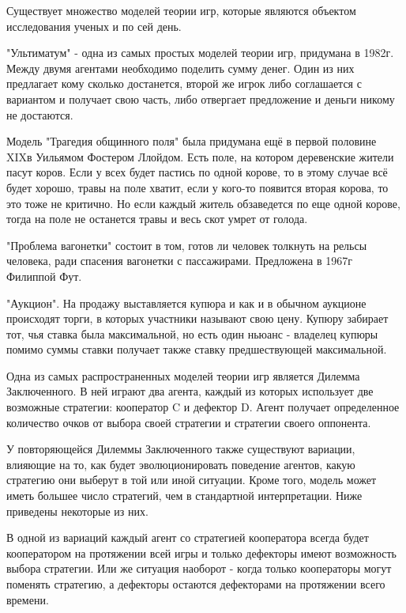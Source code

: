 \documentclass[12pt,a4paper]{article}
\begin{document}
	\par Существует множество моделей теории игр, которые являются объектом исследования ученых и по сей день.
	
	\par "Ультиматум" - одна из самых простых моделей теории игр, придумана в 1982г. Между двумя агентами необходимо поделить сумму денег. Один из них предлагает кому сколько достанется, второй же игрок либо соглашается с вариантом и получает свою часть, либо отвергает предложение и деньги никому не достаются. 
	
	\par Модель "Трагедия общинного поля" была придумана ещё в первой половине XIXв Уильямом Фостером Ллойдом. Есть поле, на котором деревенские жители пасут коров.
	Если у всех будет пастись по одной корове, то в этому случае всё будет хорошо, травы на поле хватит, если у кого-то появится вторая корова, то это тоже не критично. Но если каждый житель обзаведется по еще одной корове, тогда на поле не останется травы и весь скот умрет от голода. 
	\par "Проблема вагонетки" состоит в том, готов ли человек толкнуть на рельсы человека, ради спасения вагонетки с пассажирами. Предложена в 1967г Филиппой Фут. 
	
	\par "Аукцион". На продажу выставляется купюра и как и в обычном аукционе происходят торги, в которых участники называют свою цену. Купюру забирает тот, чья ставка была максимальной, но есть один ньюанс - владелец купюры помимо суммы ставки получает также ставку предшествующей максимальной. 
	
	\par Одна из самых распространенных моделей теории игр является Дилемма Заключенного.
	В ней играют два агента, каждый из которых использует две возможные стратегии: 
	кооператор C и дефектор D. Агент получает определенное количество очков от выбора
	своей стратегии и стратегии своего оппонента.
	
	\par У повторяющейся Дилеммы Заключенного также существуют вариации, влияющие на то, как будет эволюционировать поведение агентов, какую стратегию они выберут в той или иной ситуации. Кроме того, модель может иметь большее число стратегий, чем в стандартной интерпретации. Ниже приведены некоторые из них.
	
	\par В одной из вариаций каждый агент со стратегией кооператора всегда будет кооператором на протяжении всей игры и только дефекторы имеют возможность выбора стратегии. Или же ситуация наоборот - когда только кооператоры могут поменять стратегию, а дефекторы остаются дефекторами на протяжении всего времени. 
	
\end{document}
